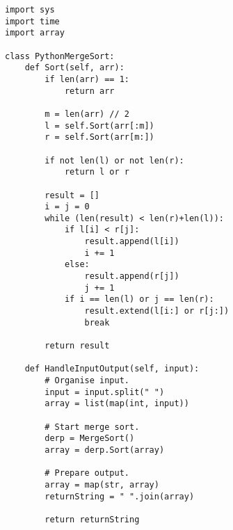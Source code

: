 	\lstset{style=python}
	\begin{lstlisting}
import sys
import time
import array

class PythonMergeSort:
	def Sort(self, arr):
		if len(arr) == 1:
			return arr
		
		m = len(arr) // 2
		l = self.Sort(arr[:m])
		r = self.Sort(arr[m:])

		if not len(l) or not len(r):
			return l or r
			
		result = []
		i = j = 0
		while (len(result) < len(r)+len(l)):        
			if l[i] < r[j]:
				result.append(l[i])
				i += 1
			else:
				result.append(r[j])
				j += 1            
			if i == len(l) or j == len(r):            
				result.extend(l[i:] or r[j:])
				break
			
		return result
	
	def HandleInputOutput(self, input):
		# Organise input.
		input = input.split(" ")
		array = list(map(int, input))
		
		# Start merge sort.
		derp = MergeSort()
		array = derp.Sort(array)

		# Prepare output.
		array = map(str, array)
		returnString = " ".join(array)

		return returnString

	\end{lstlisting}
